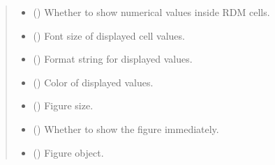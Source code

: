 \documentclass[letterpaper,10pt,english]{sphinxhowto}
\begin{document}
\begin{fulllineitems}
\begin{quote}
\begin{description}
\begin{itemize}
\item {} 
\sphinxAtStartPar
{} (\sphinxstyleliteralemphasis{\sphinxupquote{, }}) \textendash{} Whether to show numerical values inside RDM cells.

\item {} 
\sphinxAtStartPar
{} (\sphinxstyleliteralemphasis{\sphinxupquote{, }}) \textendash{} Font size of displayed cell values.

\item {} 
\sphinxAtStartPar
{} (\sphinxstyleliteralemphasis{\sphinxupquote{, }}) \textendash{} Format string for displayed values.

\item {} 
\sphinxAtStartPar
{} (\sphinxstyleliteralemphasis{\sphinxupquote{, }}) \textendash{} Color of displayed values.

\item {} 
\sphinxAtStartPar
{} (\sphinxstyleliteralemphasis{\sphinxupquote{, }}) \textendash{} Figure size.

\item {} 
\sphinxAtStartPar
{} (\sphinxstyleliteralemphasis{\sphinxupquote{, }}) \textendash{} Whether to show the figure immediately.

\end{itemize}

\sphinxAtStartPar
\begin{itemize}
\item {} 
\sphinxAtStartPar
{} () \textendash{} Figure object.


\end{itemize}
\end{description}
\end{quote}
\end{fulllineitems}
\end{document}
